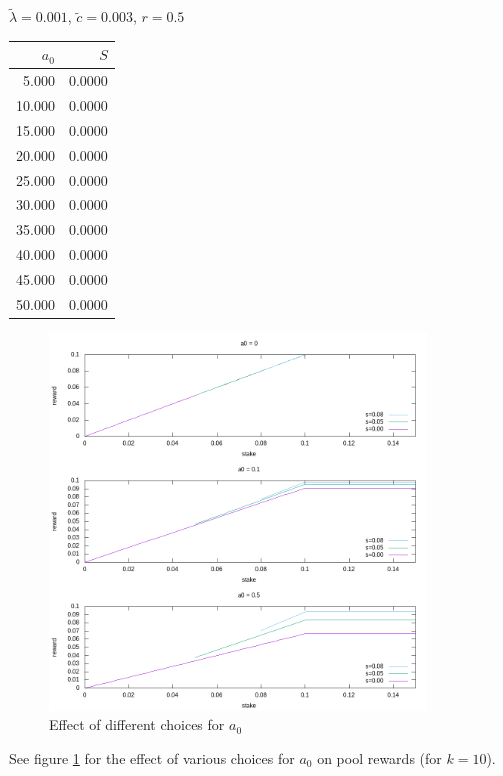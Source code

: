 \documentclass[11pt,a4paper]{article}
\begin{document}
\begin{minipage}[t]{\textwidth}
\begin{minipage}[t]{0.32\textwidth}
        \footnotesize
        \begin{flushleft}$\tilde{\lambda}=0.001$, $\tilde{c}=0.003$, $r=0.5$\end{flushleft}
        \begin{tabular}[t]{rr}
            $a_0$ & $S$ \\
            \hline
             5.000 & 0.0000 \\
            10.000 & 0.0000 \\
            15.000 & 0.0000 \\
            20.000 & 0.0000 \\
            25.000 & 0.0000 \\
            30.000 & 0.0000 \\
            35.000 & 0.0000 \\
            40.000 & 0.0000 \\
            45.000 & 0.0000 \\
            50.000 & 0.0000 \\
        \end{tabular}
    \end{minipage}
\end{minipage}

\begin{figure}
\centering
\includegraphics[width=10cm]{rewards.png}
\caption{Effect of different choices for \(a_0\)\label{figrewards}}
\end{figure}

See figure \ref{figrewards} for the effect of various choices for
\(a_0\) on pool rewards (for \(k=10\)).
\end{document}
